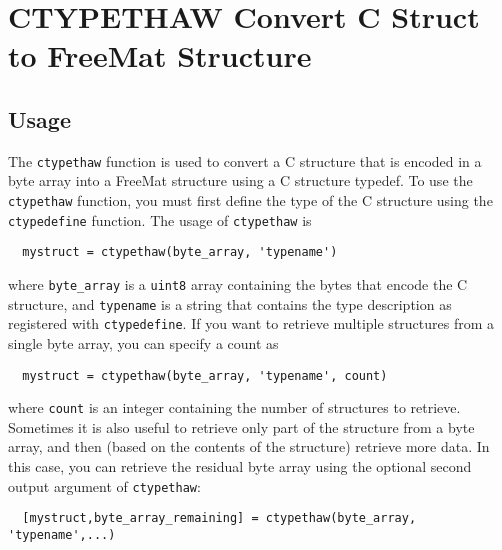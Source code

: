 \section{CTYPETHAW Convert C Struct to FreeMat Structure}

\subsection{Usage}

The \verb|ctypethaw| function is used to convert a C structure that is
encoded in a byte array into a FreeMat structure using a C structure
typedef.  To use the \verb|ctypethaw| function, you must first define
the type of the C structure using the \verb|ctypedefine| function.  The
usage of \verb|ctypethaw| is
\begin{verbatim}
  mystruct = ctypethaw(byte_array, 'typename')
\end{verbatim}
where \verb|byte_array| is a \verb|uint8| array containing the bytes that encode
the C structure, and \verb|typename| is a string that contains the type
description as registered with \verb|ctypedefine|.  If you want to
retrieve multiple structures from a single byte array, you can specify
a count as
\begin{verbatim}
  mystruct = ctypethaw(byte_array, 'typename', count)
\end{verbatim}
where \verb|count| is an integer containing the number of structures to 
retrieve.  Sometimes it is also useful to retrieve only part of the
structure from a byte array, and then (based on the contents of the
structure) retrieve more data.  In this case, you can retrieve the
residual byte array using the optional second output argument of
\verb|ctypethaw|:
\begin{verbatim}
  [mystruct,byte_array_remaining] = ctypethaw(byte_array, 'typename',...)
\end{verbatim}
